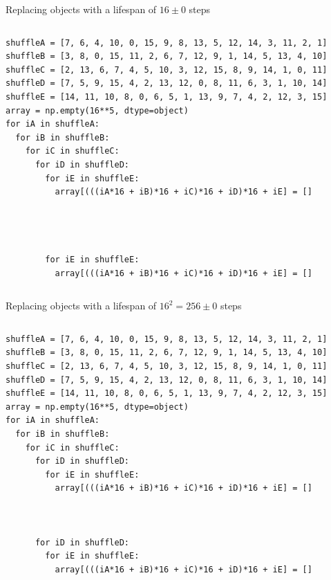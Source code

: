 \documentclass[aspectratio=169]{beamer}
\begin{document}
\begin{frame}[fragile]{Replacing objects with a lifespan of $16 \pm 0$ steps}
\small
\begin{columns}
\begin{verbatim}
shuffleA = [7, 6, 4, 10, 0, 15, 9, 8, 13, 5, 12, 14, 3, 11, 2, 1]
shuffleB = [3, 8, 0, 15, 11, 2, 6, 7, 12, 9, 1, 14, 5, 13, 4, 10]
shuffleC = [2, 13, 6, 7, 4, 5, 10, 3, 12, 15, 8, 9, 14, 1, 0, 11]
shuffleD = [7, 5, 9, 15, 4, 2, 13, 12, 0, 8, 11, 6, 3, 1, 10, 14]
shuffleE = [14, 11, 10, 8, 0, 6, 5, 1, 13, 9, 7, 4, 2, 12, 3, 15]
array = np.empty(16**5, dtype=object)
for iA in shuffleA:
  for iB in shuffleB:
    for iC in shuffleC:
      for iD in shuffleD:
        for iE in shuffleE:
          array[(((iA*16 + iB)*16 + iC)*16 + iD)*16 + iE] = []




        for iE in shuffleE:
          array[(((iA*16 + iB)*16 + iC)*16 + iD)*16 + iE] = []
\end{verbatim}
\end{columns}
\end{frame}

\begin{frame}[fragile]{Replacing objects with a lifespan of $16^2 = 256 \pm 0$ steps}
\small
\begin{columns}
\begin{verbatim}
shuffleA = [7, 6, 4, 10, 0, 15, 9, 8, 13, 5, 12, 14, 3, 11, 2, 1]
shuffleB = [3, 8, 0, 15, 11, 2, 6, 7, 12, 9, 1, 14, 5, 13, 4, 10]
shuffleC = [2, 13, 6, 7, 4, 5, 10, 3, 12, 15, 8, 9, 14, 1, 0, 11]
shuffleD = [7, 5, 9, 15, 4, 2, 13, 12, 0, 8, 11, 6, 3, 1, 10, 14]
shuffleE = [14, 11, 10, 8, 0, 6, 5, 1, 13, 9, 7, 4, 2, 12, 3, 15]
array = np.empty(16**5, dtype=object)
for iA in shuffleA:
  for iB in shuffleB:
    for iC in shuffleC:
      for iD in shuffleD:
        for iE in shuffleE:
          array[(((iA*16 + iB)*16 + iC)*16 + iD)*16 + iE] = []



      for iD in shuffleD:
        for iE in shuffleE:
          array[(((iA*16 + iB)*16 + iC)*16 + iD)*16 + iE] = []
\end{verbatim}
\end{columns}
\end{frame}
\end{document}
